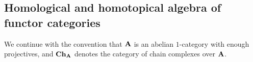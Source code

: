\documentclass[psamsfonts]{amsart}
\theoremstyle{plain}
\theoremstyle{definition}
\theoremstyle{remark}
\newcommand{\catname}[1]{{\normalfont\textbf{#1}}}
\newcommand{\ch}{\catname{Ch}}
\begin{document}




 \subsection{Homological and homotopical algebra of functor categories}\label{sec:homological} 
  We continue with the convention that $\catname{A}$ is an abelian $1$-category with enough projectives, and $\ch_{\catname{A}}$ denotes the category of chain complexes over $\catname{A}$. 
\end{document}
